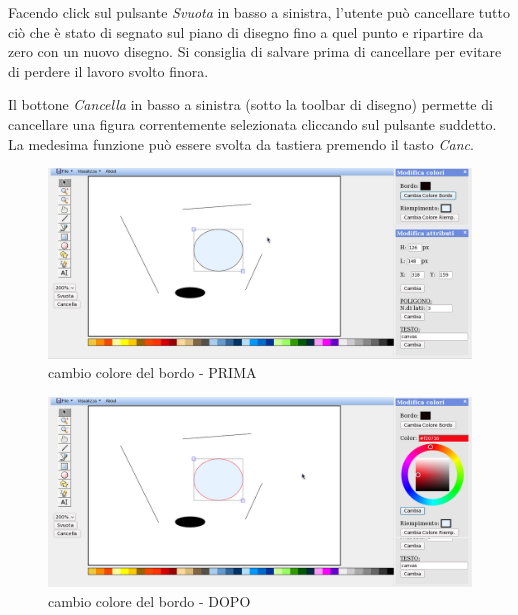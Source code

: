 
\vspace{100pt}
Facendo click sul pulsante \textit{Svuota} in basso a sinistra, l'utente pu\`o cancellare tutto ci\`o che \`e stato di segnato sul piano di disegno fino a quel punto e ripartire da zero con un nuovo disegno. Si consiglia di salvare prima di cancellare per evitare di perdere il lavoro svolto finora.



\vspace{100pt}
Il bottone \textit{Cancella} in basso a sinistra (sotto la toolbar di disegno) permette di cancellare una figura correntemente selezionata cliccando sul pulsante suddetto. La medesima funzione pu\`o essere svolta da tastiera premendo il tasto \textit{Canc}.

\begin{figure}[!ht]
\centering
\includegraphics[scale=0.4]{images/colore_bordo_prima.png}
\caption{cambio colore del bordo  - PRIMA}
\end{figure} 

\begin{figure}[!ht]
\centering
\includegraphics[scale=0.4]{images/colore_bordo_dopo.png}
\caption{cambio colore del bordo  - DOPO}
\end{figure} 


